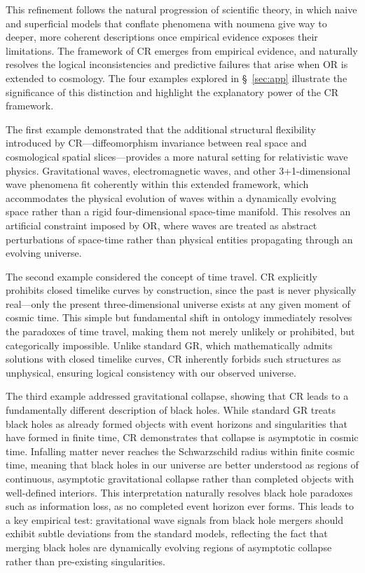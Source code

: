 \documentclass[aps,prd,reprint,superscriptaddress]{revtex4-2}
\begin{document}
This refinement follows the natural progression of scientific theory, in which naive and superficial models that conflate phenomena with noumena give way to deeper, more coherent descriptions once empirical evidence exposes their limitations. The framework of CR emerges from empirical evidence, and naturally resolves the logical inconsistencies and predictive failures that arise when OR is extended to cosmology. The four examples explored in \S~\ref{sec:app} illustrate the significance of this distinction and highlight the explanatory power of the CR framework.

The first example demonstrated that the additional structural flexibility introduced by CR---diffeomorphism invariance between real space and cosmological spatial slices---provides a more natural setting for relativistic wave physics. Gravitational waves, electromagnetic waves, and other 3+1-dimensional wave phenomena fit coherently within this extended framework, which accommodates the physical evolution of waves within a dynamically evolving space rather than a rigid four-dimensional space-time manifold. This resolves an artificial constraint imposed by OR, where waves are treated as abstract perturbations of space-time rather than physical entities propagating through an evolving universe.

The second example considered the concept of time travel. CR explicitly prohibits closed timelike curves by construction, since the past is never physically real---only the present three-dimensional universe exists at any given moment of cosmic time. This simple but fundamental shift in ontology immediately resolves the paradoxes of time travel, making them not merely unlikely or prohibited, but categorically impossible. Unlike standard GR, which mathematically admits solutions with closed timelike curves, CR inherently forbids such structures as unphysical, ensuring logical consistency with our observed universe.

The third example addressed gravitational collapse, showing that CR leads to a fundamentally different description of black holes. While standard GR treats black holes as already formed objects with event horizons and singularities that have formed in finite time, CR demonstrates that collapse is asymptotic in cosmic time. Infalling matter never reaches the Schwarzschild radius within finite cosmic time, meaning that black holes in our universe are better understood as regions of continuous, asymptotic gravitational collapse rather than completed objects with well-defined interiors. This interpretation naturally resolves black hole paradoxes such as information loss, as no completed event horizon ever forms. This leads to a key empirical test: gravitational wave signals from black hole mergers should exhibit subtle deviations from the standard models, reflecting the fact that merging black holes are dynamically evolving regions of asymptotic collapse rather than pre-existing singularities.
\end{document}
